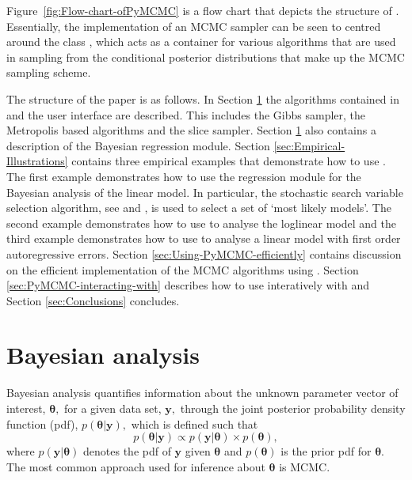 \documentclass[article]{jss}
\begin{document}
Figure~\ref{fig:Flow-chart-ofPyMCMC} is a flow chart that depicts
the structure of . Essentially, the implementation of an MCMC
sampler can be seen to centred around the class , which
acts as a container for various algorithms that are used in sampling
from the conditional posterior distributions that make up the MCMC
sampling scheme. 

The structure of the paper is as follows. In Section
\ref{sec:Bayesian-Analysis} the algorithms contained in 
and the user interface are described.  This includes the Gibbs
sampler, the Metropolis based algorithms and the slice sampler.
Section \ref{sec:Bayesian-Analysis} also contains a description of the
Bayesian regression module. Section \ref{sec:Empirical-Illustrations}
contains three empirical examples that demonstrate how to use
.  The first example demonstrates how to use the
regression module for the Bayesian analysis of the linear model. In
particular, the stochastic search variable selection algorithm, see
\citet{GeorgeMcCulloch1993} and \citet{MarinRobert2007}, is used to
select a set of `most likely models'. The second example demonstrates
how to use  to analyse the loglinear model and the third
example demonstrates how to use  to analyse a linear model
with first order autoregressive errors.  Section
\ref{sec:Using-PyMCMC-efficiently} contains discussion on the
efficient implementation of the MCMC algorithms using .
Section \ref{sec:PyMCMC-interacting-with} describes how to use
 interatively with  and Section
\ref{sec:Conclusions} concludes.


\section{Bayesian analysis}
\label{sec:Bayesian-Analysis}

Bayesian analysis quantifies information about the unknown parameter
vector of interest, $\bm{\theta},$ for a given data set, $\bm{y},$
through the joint posterior probability density function (pdf),
$p(\bm{\theta}|\bm{y}),$ which is defined such that \begin{equation}
  p(\bm{\theta}|\bm{y})\propto p(\bm{y}|\bm{\theta})\times
  p(\bm{\theta}),\label{eq:joint post}\end{equation} where
$p(\bm{y}|\bm{\theta})$ denotes the pdf of $\bm{y}$ given
$\bm{\theta}$ and $p(\bm{\theta})$ is the prior pdf for $\bm{\theta}.$
The most common approach used for inference about $\bm{\theta}$ is
MCMC.
\end{document}
